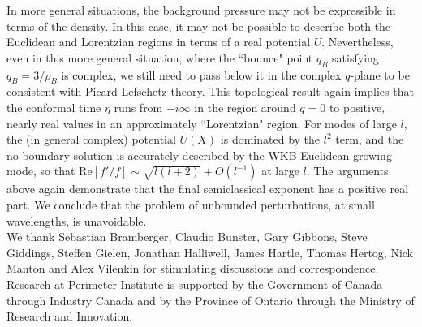 \documentclass[twocolumn,amsmath,amssymb,superscriptaddress,nofootinbib]{revtex4-1}
\begin{document}
In more general situations, the background pressure may not be expressible in terms of the density. In this case, it may not be possible to describe both the Euclidean and Lorentzian regions in terms of a real potential $U$. Nevertheless, even in this more general situation, where the ``bounce" point $q_B$ satisfying $q_B=3/\rho_B$ is complex, we still need to pass below it in the complex $q$-plane to be consistent with Picard-Lefschetz theory. This topological result again implies that the conformal time $\eta$ runs from $- i \infty$ in the region around $q=0$ to positive, nearly real values in an approximately ``Lorentzian" region. For modes of large $l$, the (in general complex) potential $U(X)$ is dominated by the $l^2$ term, and the no boundary solution is accurately described by the WKB Euclidean growing mode, so that Re$[f'/f]\sim \sqrt{l(l+2)}+O(l^{-1})$ at large $l$. The arguments above again demonstrate that the final semiclassical exponent has a positive real part. We conclude that the problem of unbounded perturbations, at small wavelengths, is unavoidable.  \\
















We thank Sebastian Bramberger, Claudio Bunster, Gary Gibbons, Steve Giddings, Steffen Gielen, Jonathan Halliwell, James Hartle, Thomas Hertog, Nick Manton and Alex Vilenkin for stimulating discussions and correspondence. Research at Perimeter Institute is supported by the Government of Canada through Industry Canada and by the Province of Ontario through the Ministry of Research and Innovation.

%

\end{document}
